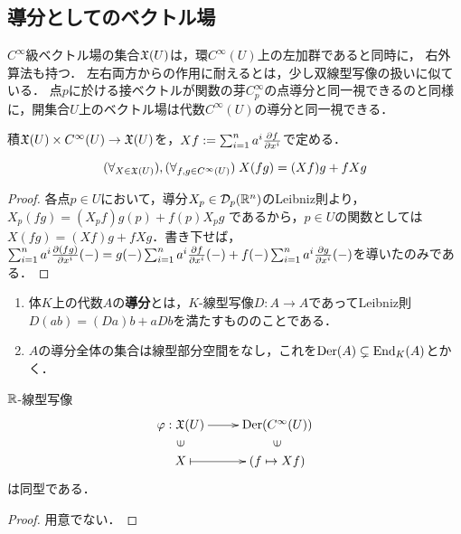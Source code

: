 \documentclass[uplatex,dvipdfmx]{jsreport}
\begin{document}
\subsection{導分としてのベクトル場}

\begin{tcolorbox}[colframe=ForestGreen, colback=ForestGreen!10!white, breakable ,colbacktitle=ForestGreen!40!white, coltitle=black,fonttitle=\bfseries\sffamily,
    title=]
    $C^\infty$級ベクトル場の集合$\mathfrak{X}(U)$は，環$C^\infty(U)$上の左加群であると同時に，
    右外算法も持つ．
    左右両方からの作用に耐えるとは，少し双線型写像の扱いに似ている．
    点$p$に於ける接ベクトルが関数の芽$C^\infty_p$の点導分と同一視できるのと同様に，開集合$U$上のベクトル場は代数$C^\infty(U)$の導分と同一視できる．
\end{tcolorbox}

\begin{definition}[ベクトル場の右外算法]
    積$\mathfrak{X}(U)\times C^\infty(U)\to\mathfrak{X}(U)$を，$Xf:=\sum^n_{i=1}a^i\frac{\partial f}{\partial x^i}$で定める．
\end{definition}

\begin{proposition}[ベクトル場の作用のLeibniz則]
    \[(\forall_{X\in\mathfrak{X}(U)}),(\forall_{f,g\in C^\infty(U)})\;X(fg)=(Xf)g+fXg\]
\end{proposition}
\begin{proof}
    各点$p\in U$において，導分$X_p\in\mathcal{D}_p(\mathbb{R}^n)$のLeibniz則より，
    $X_p(fg)=(X_pf)g(p)+f(p)X_pg$
    であるから，$p\in U$の関数としては$X(fg)=(Xf)g+fXg$．書き下せば，$\sum^n_{i=1}a^i\frac{\partial (fg)}{\partial x^i}(-)=g(-)\sum^n_{i=1}a^i\frac{\partial f}{\partial x^i}(-)+f(-)\sum^n_{i=1}a^i\frac{\partial g}{\partial x^i}(-)$を導いたのみである．
\end{proof}

\begin{definition}\mbox{}
    \begin{enumerate}
        \item 体$K$上の代数$A$の\textbf{導分}とは，$K$-線型写像$D:A\to A$であってLeibniz則$D(ab)=(Da)b+aDb$を満たすもののことである．
        \item $A$の導分全体の集合は線型部分空間をなし，これを$\mathrm{Der}(A)\subsetneq\mathrm{End}_K(A)$とかく．
    \end{enumerate}
\end{definition}


\begin{theorem}[ベクトル場と導分の同一視]
    $\mathbb{R}$-線型写像
    \[\xymatrix@R-2pc{
        \varphi:\fX(U)\ar[r]&\Der(C^\infty(U))\\
        \rotatebox[origin=c]{90}{$\in$}&\rotatebox[origin=c]{90}{$\in$}\\
        X\ar@{|->}[r]&(f\mapsto Xf)
    }\]
    は同型である．
\end{theorem}
\begin{proof}\mbox{}
    用意でない．
\end{proof}
\end{document}
